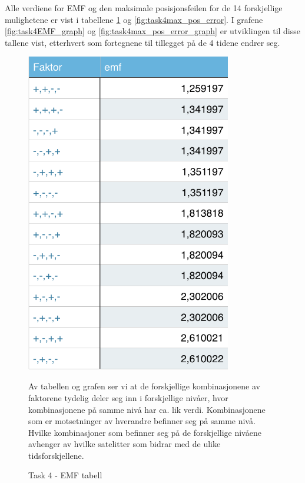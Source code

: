 Alle verdiene for EMF og den maksimale posisjonsfeilen for de 14 forskjellige mulighetene er vist i tabellene \ref{fig:task4EMF} og \ref{fig:task4max_pos_error}. I grafene \ref{fig:task4EMF_graph} og \ref{fig:task4max_pos_error_graph} er utviklingen til disse tallene vist, etterhvert som fortegnene til tillegget på de 4 tidene endrer seg. 

\begin{figure}[h]
	\begin{minipage}{.5\textwidth}
		\centering
		\includegraphics[width=0.8\textwidth]{sections/Exercise4/task4emf.png}
			\caption{Task 4 - EMF tabell}
			\label{fig:task4EMF}
	\end{minipage}
	\vspace{20 mm}
	\begin{minipage}{.5\textwidth}
	Av tabellen og grafen ser vi at de forskjellige kombinasjonene av faktorene tydelig deler seg inn i forskjellige nivåer, hvor kombinasjonene på samme nivå har ca. lik verdi. Kombinasjonene som er motsetninger av hverandre befinner seg på samme nivå. Hvilke kombinasjoner som befinner seg på de forskjellige nivåene avhenger av hvilke satelitter som bidrar med de ulike tidsforskjellene.
	\end{minipage}


\end{figure}
